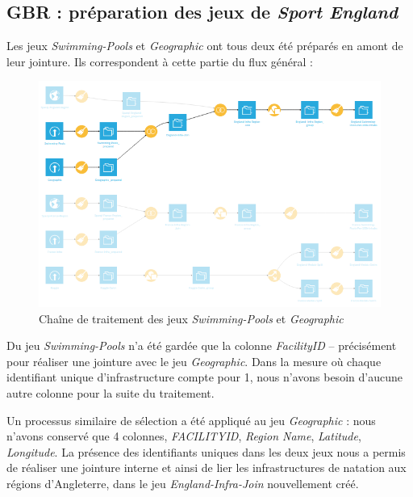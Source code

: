 \documentclass[hidelinks, 12pt]{report}
\begin{document}
%





\subsection{GBR : préparation des jeux de \textit{Sport England}}

Les jeux \textit{Swimming-Pools} et \textit{Geographic} ont tous deux été préparés en amont de leur jointure. Ils correspondent à cette partie du flux général :

\begin{center}
	\begin{figure}[H]
		\setlength{\belowcaptionskip}{-35pt}
		\includegraphics[scale=0.55]{images/flow-swim-eng-sport.png}
		\caption{Chaîne de traitement des jeux \textit{Swimming-Pools} et \textit{Geographic}}
	\end{figure}
\end{center}

Du jeu \textit{Swimming-Pools} n'a été gardée que la colonne \textit{FacilityID} -- précisément pour réaliser une jointure avec le jeu \textit{Geographic}. Dans la mesure où chaque identifiant unique d'infrastructure compte pour 1, nous n'avons besoin d'aucune autre colonne pour la suite du traitement.

Un processus similaire de sélection a été appliqué au jeu \textit{Geographic} : nous n'avons conservé que 4 colonnes, \textit{FACILITYID}, \textit{Region Name}, \textit{Latitude}, \textit{Longitude}. La présence des identifiants uniques dans les deux jeux nous a permis de réaliser une jointure interne et ainsi de lier les infrastructures de natation aux régions d'Angleterre, dans le jeu \textit{England-Infra-Join} nouvellement créé.
\end{document}
